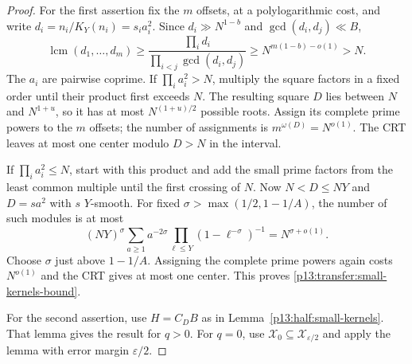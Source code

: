 \begin{proof}
For the first assertion fix the $m$ offsets, at a polylogarithmic cost,
and write $d_i=n_i/K_Y(n_i)=s_i a_i^2$. Since
$d_i\gg N^{1-b}$ and $\gcd(d_i,d_j)\ll B$,
\[
 \operatorname{lcm}(d_1,\ldots,d_m)
 \geq\frac{\prod_i d_i}{\prod_{i<j}\gcd(d_i,d_j)}
 \geq N^{m(1-b)-o(1)}>N.
\]
The $a_i$ are pairwise coprime. If $\prod_i a_i^2>N$, multiply the
square factors in a fixed order until their product first exceeds $N$.
The resulting square $D$ lies between $N$ and $N^{1+u}$, so it has
at most $N^{(1+u)/2}$ possible roots. Assign its complete prime powers
to the $m$ offsets; the number of assignments is
$m^{\omega(D)}=N^{o(1)}$. The CRT leaves at most one center modulo
$D>N$ in the interval.

If $\prod_i a_i^2\leq N$, start with this product and add the small
prime factors from the least common multiple until the first crossing
of $N$. Now $N<D\leq NY$ and $D=sa^2$ with $s$ $Y$-smooth.
For fixed $\sigma>\max(1/2,1-1/A)$, the number of such modules is at most
\[
 (NY)^\sigma\sum_{a\geq1}a^{-2\sigma}
       \prod_{\ell\leq Y}(1-\ell^{-\sigma})^{-1}
       =N^{\sigma+o(1)}.
\]
Choose $\sigma$ just above $1-1/A$. Assigning the complete prime powers
again costs $N^{o(1)}$ and the CRT gives at most one center. This proves
\eqref{p13:transfer:small-kernels-bound}.

For the second assertion, use $H=C_DB$ as in
Lemma~\ref{p13:half:small-kernels}.
That lemma gives the result for $q>0$.
For $q=0$, use $\mathcal X_0\subseteq\mathcal X_{\varepsilon/2}$
and apply the lemma with error margin $\varepsilon/2$.
\end{proof}
